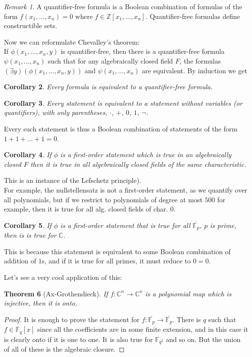 \documentclass[12pt]{article}
\newtheorem{theorem}{Theorem}[section]
\newtheorem{corollary}[theorem]{Corollary}
\theoremstyle{remark}
\newtheorem{remark}[theorem]{Remark}
\newcommand{\C}{\mathbb{C}}
\newcommand{\Z}{\mathbb{Z}}
\begin{document}
\begin{remark}
A quantifier-free formula is a Boolean combination of formulas of the form $f(x_1,...,x_n)=0$ where $f \in \Z[x_1,...,x_n]$. Quantifier-free formulas define constructible sets.
\end{remark}

Now we can reformulate Chevalley's theorem:\\

If $\phi(x_1,...,x_n,y)$ is quantifier-free, then there is a quantifier-free formula $\psi(x_1,...,x_n)$ such that for any algebraically closed field $F$, the formulas $(\exists y)(\phi(x_1,...,x_n,y))$ and $\psi(x_1,...,x_n)$ are equivalent. By induction we get 
\begin{corollary}
Every formula is equivalent to a quantifier-free formula.
\end{corollary}

\begin{corollary}
Every statement is equivalent to a statement without variables (or quantifiers), with only parentheses, $\cdot$, $+$, $0$, $1$, $\neg$.
\end{corollary}

Every such statement is thus a Boolean combination of statements of the form $1+1+...+1 = 0$.

\begin{corollary}
If $\phi$ is a first-order statement which is true in an algebraically closed $F$ then it is true in all algebraically closed fields of the same characteristic. 
\end{corollary}
This is an instance of the Lefschetz principle). \\


For example, the nullstellensatz is not a first-order statement, as we quantify over all polynomials, but if we restrict to polynomials of degree at most $500$ for example, then it is true for all alg. closed fields of char. 0.

\begin{corollary}
If $\phi$ is a first-order statement that is true for all $\overline{\mathbb{F}_p}$, $p$ is prime, then is is true for $\C$.
\end{corollary}

This is because this statement is equivalent to some Boolean combination of addition of $1$s, and if it is true for all primes, it must reduce to $0=0$.

Let's see a very cool application of this:

\begin{theorem}[Ax-Grothendieck]
If $f: \C^n \rightarrow \C^n$ is a polynomial map which is injective, then it is onto.
\end{theorem}
\begin{proof}
It is enough to prove the statement for $f: \overline{\mathbb{F}_p} \rightarrow  \overline{\mathbb{F}_p}$. There is $q$ such that $f \in \mathbb{F}_q[x]$ since all the coefficients are in some finite extension, and in this case it is clearly onto if it is one to one. It is also true for $\mathbb{F}_{q^2}$ and so on. But the union of all of these is the algebraic closure.
\end{proof}
\end{document}
